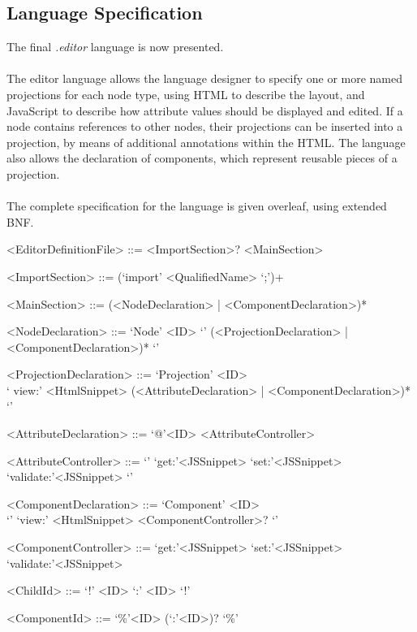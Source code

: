 \documentclass{article}
\begin{document}
{\subsection{Language Specification}
The final \emph{.editor} language is now presented. 
\\
\\
The editor language allows the language designer to specify one or more named projections for each node type, using HTML to describe the layout, and JavaScript to describe how attribute values should be displayed and edited. If a node contains references to other nodes, their projections can be inserted into a projection, by means of additional annotations within the HTML. The language also allows the declaration of components, which represent reusable pieces of a projection. 
\\
\\
The complete specification for the language is given overleaf, using extended BNF.
\newpage
\setlength{\grammarparsep}{12pt plus 1pt minus 1pt} %
\setlength{\grammarindent}{5em} %

\begin{grammar}

<EditorDefinitionFile> ::= <ImportSection>? <MainSection>

<ImportSection> ::= (`import' <QualifiedName> `;')+ 

<MainSection> ::= (<NodeDeclaration> | <ComponentDeclaration>)*

<NodeDeclaration> ::= `Node' <ID> `{' (<ProjectionDeclaration> | <ComponentDeclaration>)* `}'

<ProjectionDeclaration> ::= `Projection' <ID> \\ `{ view:' <HtmlSnippet> (<AttributeDeclaration> | <ComponentDeclaration>)* `}'

<AttributeDeclaration> ::= `@'<ID> <AttributeController>

<AttributeController> ::= `{' `get:'<JSSnippet> `set:'<JSSnippet> `validate:'<JSSnippet> `}'

<ComponentDeclaration> ::= `Component' <ID> \\`{' `view:' <HtmlSnippet> <ComponentController>? `}'

<ComponentController> ::= `get:'<JSSnippet> `set:'<JSSnippet> `validate:'<JSSnippet> 
 
<ChildId> ::= `!' <ID> `:' <ID> `!'
 
<ComponentId> ::= `\%'<ID> (`:'<ID>)? `\%'


\end{grammar}}
\end{document}
